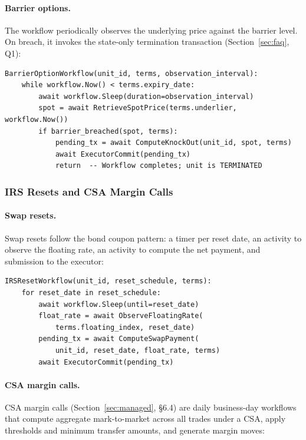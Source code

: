 \documentclass[11pt,a4paper]{article}
\begin{document}
\paragraph{Barrier options.} The workflow periodically observes the underlying price against the barrier level. On breach, it invokes the state-only termination transaction (Section~\ref{sec:faq}, Q1):

\begin{lstlisting}
BarrierOptionWorkflow(unit_id, terms, observation_interval):
    while workflow.Now() < terms.expiry_date:
        await workflow.Sleep(duration=observation_interval)
        spot = await RetrieveSpotPrice(terms.underlier, workflow.Now())
        if barrier_breached(spot, terms):
            pending_tx = await ComputeKnockOut(unit_id, spot, terms)
            await ExecutorCommit(pending_tx)
            return  -- Workflow completes; unit is TERMINATED
\end{lstlisting}

\subsubsection{IRS Resets and CSA Margin Calls}

\paragraph{Swap resets.} Swap resets follow the bond coupon pattern: a timer per reset date, an activity to observe the floating rate, an activity to compute the net payment, and submission to the executor:

\begin{lstlisting}
IRSResetWorkflow(unit_id, reset_schedule, terms):
    for reset_date in reset_schedule:
        await workflow.Sleep(until=reset_date)
        float_rate = await ObserveFloatingRate(
            terms.floating_index, reset_date)
        pending_tx = await ComputeSwapPayment(
            unit_id, reset_date, float_rate, terms)
        await ExecutorCommit(pending_tx)
\end{lstlisting}

\paragraph{CSA margin calls.} CSA margin calls (Section~\ref{sec:managed}, \S6.4) are daily business-day workflows that compute aggregate mark-to-market across all trades under a CSA, apply thresholds and minimum transfer amounts, and generate margin moves:
\end{document}
